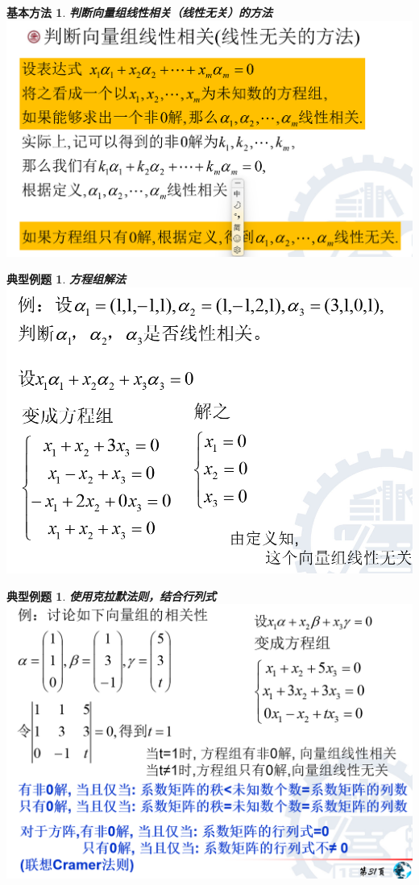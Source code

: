\documentclass[12pt,oneside]{ctexbook}
\newtheorem{method}[subsection]{基本方法}
\newtheorem{problem}[subsection]{典型例题}
\begin{document}
\begin{method}
    \textbf{判断向量组线性相关（线性无关）的方法}
    \\ \includegraphics[scale=0.4]{method3.1.png}
\end{method}
\begin{problem}
    \textbf{方程组解法}
    \\ \includegraphics[scale=0.7]{problem3.2.png}
\end{problem}
\begin{problem}
    \textbf{使用克拉默法则，结合行列式}
    \\ \includegraphics[scale=0.6]{problem3.3.png}
\end{problem}
\end{document}
